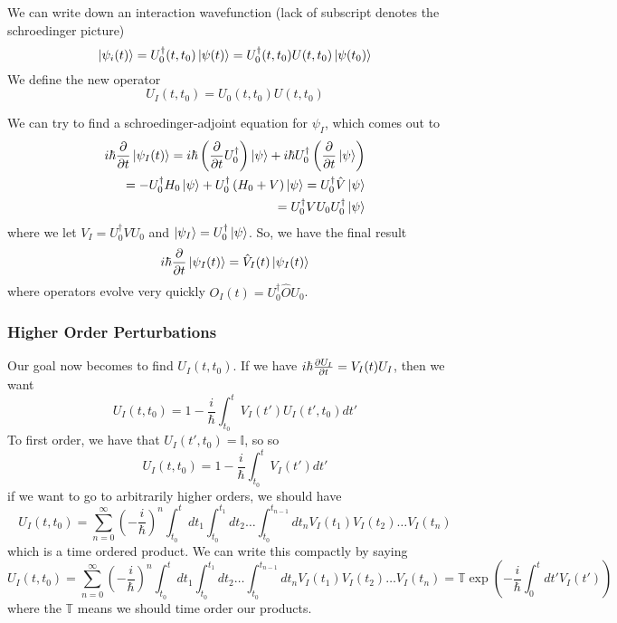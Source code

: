 \documentclass{article}
\theoremstyle{definition}
\begin{document}
We can write down an interaction wavefunction (lack of subscript denotes the schroedinger picture)
\begin{equation}
	\ket{\psi_i(t)}=U_0^\dag(t,t_0)\ket{\psi(t)}
	=U_0^\dag(t,t_0)U(t,t_0)\ket{\psi(t_0)}
\end{equation}
We define the new operator
\begin{equation}
	U_I(t,t_0)=U_0(t,t_0)U(t,t_0)
\end{equation}

We can try to find a schroedinger-adjoint equation for $\psi_I$, which comes out to
\begin{align}
	i\hbar\pdv{t}\ket{\psi_I(t)}=i\hbar\left(\pdv{t}U_0^\dag\right)\ket{\psi}+i\hbar U_0^\dag\left(\pdv{t}\ket{\psi}\right)
	\\
	=-U_0^\dag H_0\ket{\psi}+U_0^\dag\left(H_0+V\right)\ket{\psi}=U_0^\dag\hat V\ket{\psi}
	\\
	=U_0^\dag VU_0U_0^\dag\ket{\psi}
\end{align}
where we let $V_I=U_0^\dag VU_0$ and $\ket{\psi_I}=U_0^\dag\ket{\psi}$.
So, we have the final result
\begin{equation}
	i\hbar\pdv{t}\ket{\psi_I(t)}=\hat V_I(t)\ket{\psi_I(t)}
\end{equation}
where operators evolve very quickly $O_I(t)=U_0^\dag\hat OU_0$.

\subsubsection{Higher Order Perturbations}
Our goal now becomes to find $U_I(t,t_0)$.
If we have $i\hbar\pdv{U_I}{t}=V_I(t)U_I$, then we want 
\begin{equation}
	U_I(t,t_0)=1-\frac{i}{\hbar}\int_{t_0}^{t}V_I(t')U_I(t',t_0)dt'
\end{equation}
To first order, we have that $U_I(t',t_0)=\mathbb{I}$, so so
\begin{equation}
	U_I(t,t_0)=1-\frac{i}{\hbar}\int_{t_0}^{t}V_I(t')dt'
\end{equation}
if we want to go to arbitrarily higher orders, we should have
\begin{equation}
	U_I(t,t_0)=\sum_{n=0}^{\infty}\left(-\frac{i}{\hbar}\right)^n\int_{t_0}^{t}dt_1\int_{t_0}^{t_1}dt_2\dots\int_{t_0}^{t_{n-1}}dt_nV_I(t_1)V_I(t_2)\dots V_I(t_n)
\end{equation}
which is a time ordered product.
We can write this compactly by saying
\begin{equation}
	U_I(t,t_0)=\sum_{n=0}^{\infty}\left(-\frac{i}{\hbar}\right)^n\int_{t_0}^{t}dt_1\int_{t_0}^{t_1}dt_2\dots\int_{t_0}^{t_{n-1}}dt_nV_I(t_1)V_I(t_2)\dots V_I(t_n)
	=\mathbb{T}\exp(-\frac{i}{\hbar}\int_{0}^{t}dt'V_I(t'))
\end{equation}
where the $\mathbb{T}$ means we should time order our products.
\end{document}

